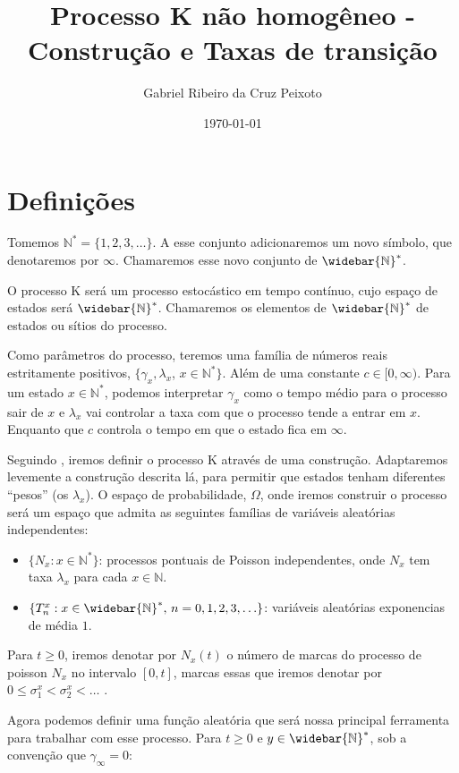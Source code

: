 \documentclass[11pt,twoside,a4paper]{article}
\author{Gabriel Ribeiro da Cruz Peixoto}
\title{Processo K não homogêneo - Construção e Taxas de transição}
\date{\today}
\newcommand{\N}{{\mathbb{N}}}
\newcommand{\Nz}{{\mathbb{N^*}}}
\newcommand{\Nzb}{{\mathbb{\widebar{N}^*}}}
\begin{document}
\maketitle

\section{Definições}
\label{sec:definicoes}

Tomemos $\Nz = \{ 1, 2, 3, \ldots\}$. A esse conjunto adicionaremos um
novo símbolo, que denotaremos por $\infty$. Chamaremos esse novo
conjunto de $\Nzb$.

O processo K será um processo estocástico em tempo contínuo, cujo
espaço de estados será $\Nzb$. Chamaremos os elementos de $\Nzb$ de
estados ou sítios do processo.

Como parâmetros do processo, teremos uma família de números reais
estritamente positivos, $\{ \gamma_x, \lambda_x$, $x \in \Nz\}$. Além de
uma constante $c \in [0, \infty)$.  Para um estado $x \in \Nz$,
podemos interpretar $\gamma_x$ como o tempo médio para o processo sair
de $x$ e $\lambda_x$ vai controlar a taxa com que o processo tende a
entrar em $x$. Enquanto que $c$ controla o tempo em que o estado fica
em $\infty$.

Seguindo \cite{fontes:08}, iremos definir o processo K através de uma
construção. Adaptaremos levemente a construção descrita lá, para
permitir que estados tenham diferentes ``pesos'' (os $\lambda_x$).  O
espaço de probabilidade, $\Omega$, onde iremos construir o processo
será um espaço que admita as seguintes famílias de variáveis
aleatórias independentes:

\begin{itemize}
\item $\{ N_x: x \in \Nz \}$: processos pontuais de Poisson
  independentes, onde $N_x$ tem taxa $\lambda_x$ para cada $x \in \N$.
\item $\{T_n^x: x \in \Nzb , \, n = 0, 1, 2, 3, \ldots \}$: variáveis
  aleatórias exponencias de média $1$.
\end{itemize}

Para $t \geq 0$, iremos denotar por $N_x(t)$ o número de marcas do
processo de poisson $N_x$ no intervalo $[0, t]$, marcas essas que
iremos denotar por $0 \leq \sigma_1^x < \sigma_2^x < \ldots$ .

Agora podemos definir uma função aleatória que será nossa principal
ferramenta para trabalhar com esse processo. Para $t \geq 0$ e $y \in
\Nzb$, sob a convenção que $\gamma_\infty = 0$:
\end{document}
